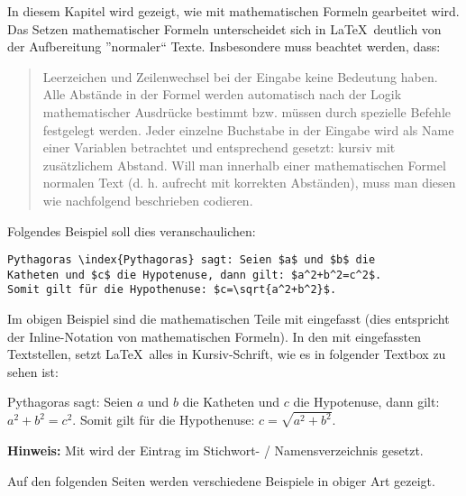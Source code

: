 In diesem Kapitel wird gezeigt, wie mit mathematischen Formeln  gearbeitet wird. Das Setzen mathematischer Formeln unterscheidet sich in \LaTeX\ deutlich von der Aufbereitung ”normaler“ Texte. Insbesondere muss beachtet werden, dass:

\begin{quote}
Leerzeichen und Zeilenwechsel bei der Eingabe keine Bedeutung haben. Alle Abstände in der Formel werden automatisch nach der Logik mathematischer Ausdrücke bestimmt bzw. müssen durch spezielle Befehle festgelegt werden. Jeder einzelne Buchstabe in der Eingabe wird als Name einer Variablen betrachtet und entsprechend gesetzt: kursiv mit zusätzlichem Abstand. Will man innerhalb einer mathematischen Formel normalen Text (d. h. aufrecht mit korrekten Abständen), muss man diesen wie nachfolgend beschrieben codieren.
\end{quote}

\par\bigskip 
\par\bigskip 
Folgendes Beispiel soll dies veranschaulichen:

\begin{tcolorbox}[width=\textwidth,colback={light-gray},title={Latex-Text},colbacktitle=gray,coltitle=white]

\begin{verbatim}
Pythagoras \index{Pythagoras} sagt: Seien $a$ und $b$ die 
Katheten und $c$ die Hypotenuse, dann gilt: $a^2+b^2=c^2$. 
Somit gilt für die Hypothenuse: $c=\sqrt{a^2+b^2}$.
\end{verbatim}

\end{tcolorbox}

Im obigen Beispiel sind die mathematischen Teile mit \code{\$} eingefasst (dies entspricht der Inline-Notation von mathematischen Formeln). In den mit \code{\$} eingefassten Textstellen, setzt \LaTeX\ alles in Kursiv-Schrift, wie es in folgender Textbox zu sehen ist: 

\begin{tcolorbox}[width=\textwidth,colback={light-gray},title={Print-Text},colbacktitle=gray,coltitle=white]

Pythagoras  sagt: Seien $a$ und $b$ die 
Katheten und $c$ die Hypotenuse, dann gilt: $a^2+b^2=c^2$. 
Somit gilt für die Hypothenuse: $c=\sqrt{a^2+b^2}$.

\end{tcolorbox}

\textbf{Hinweis:} Mit  wird der Eintrag im Stichwort- / Namensverzeichnis gesetzt.

\par\bigskip 
\par\bigskip 
Auf den folgenden Seiten werden verschiedene Beispiele in obiger Art gezeigt.
